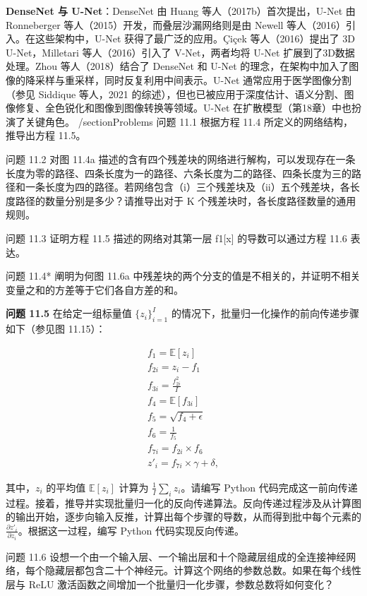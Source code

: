 \textbf{DenseNet 与 U-Net}：DenseNet 由 Huang 等人（2017b）首次提出，U-Net 由 Ronneberger 等人（2015）开发，而叠层沙漏网络则是由 Newell 等人（2016）引入。在这些架构中，U-Net 获得了最广泛的应用。Çiçek 等人（2016）提出了 3D U-Net，Milletari 等人（2016）引入了 V-Net，两者均将 U-Net 扩展到了3D数据处理。Zhou 等人（2018）结合了 DenseNet 和 U-Net 的理念，在架构中加入了图像的降采样与重采样，同时反复利用中间表示。U-Net 通常应用于医学图像分割（参见 Siddique 等人，2021 的综述），但也已被应用于深度估计、语义分割、图像修复、全色锐化和图像到图像转换等领域。U-Net 在扩散模型（第18章）中也扮演了关键角色。
/section{Problems}  
问题 11.1 根据方程 11.4 所定义的网络结构，推导出方程 11.5。

问题 11.2 对图 11.4a 描述的含有四个残差块的网络进行解构，可以发现存在一条长度为零的路径、四条长度为一的路径、六条长度为二的路径、四条长度为三的路径和一条长度为四的路径。若网络包含（i）三个残差块及（ii）五个残差块，各长度路径的数量分别是多少？请推导出对于 K 个残差块时，各长度路径数量的通用规则。

问题 11.3 证明方程 11.5 描述的网络对其第一层 f1[x] 的导数可以通过方程 11.6 表达。

问题 11.4* 阐明为何图 11.6a 中残差块的两个分支的值是不相关的，并证明不相关变量之和的方差等于它们各自方差的和。

\textbf{问题 11.5} 在给定一组标量值 \(\{z_i\}_{i=1}^I\) 的情况下，批量归一化操作的前向传递步骤如下（参见图 11.15）：

\begin{align}
f_1 = \mathbb{E}[z_i] \\
f_{2i} = z_i - f_1 \\
f_{3i} = \frac{f_{2i}^2}{I} \\
f_4 = \mathbb{E}[f_{3i}] \\
f_5 = \sqrt{f_4 + \epsilon} \\
f_6 = \frac{1}{f_5} \\
f_{7i} = f_{2i} \times f_6 \\
z'_i = f_{7i} \times \gamma + \delta,
\end{align} 


其中，\(z_i\) 的平均值 \(\mathbb{E}[z_i]\) 计算为 \(\frac{1}{I} \sum_{i} z_i\)。请编写 Python 代码完成这一前向传递过程。接着，推导并实现批量归一化的反向传递算法。反向传递过程涉及从计算图的输出开始，逐步向输入反推，计算出每个步骤的导数，从而得到批中每个元素的 \(\frac{\partial z'_i}{\partial z_i}\)。根据这一过程，编写 Python 代码实现反向传递。

问题 11.6 设想一个由一个输入层、一个输出层和十个隐藏层组成的全连接神经网络，每个隐藏层都包含二十个神经元。计算这个网络的参数总数。如果在每个线性层与 ReLU 激活函数之间增加一个批量归一化步骤，参数总数将如何变化？

